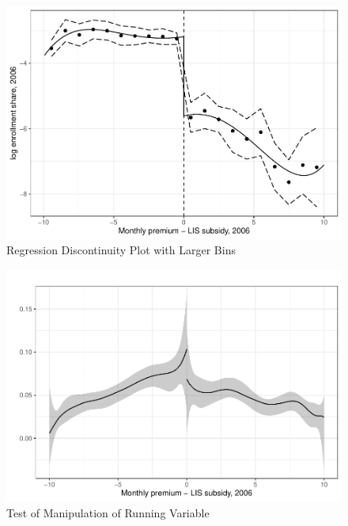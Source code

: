 \documentclass[
  12pt,
]{article}
\begin{document}
\newpage

\begin{figure}
\centering
\includegraphics{solutions_files/figure-latex/rd-plot2-1.pdf}
\caption{\label{fig:rd-plot2}Regression Discontinuity Plot with Larger Bins}
\end{figure}

\newpage

\begin{figure}
\centering
\includegraphics{solutions_files/figure-latex/rd-test-1.pdf}
\caption{\label{fig:rd-test}Test of Manipulation of Running Variable}
\end{figure}

\newpage
\end{document}

